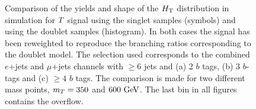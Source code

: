 \begin{figure}[htbp]
\begin{center}
\caption{
Comparison of the yields and shape of the $\HT$ distribution in simulation for $\T$ signal using the singlet samples (symbols) and
using the doublet samples (histogram). In both cases the signal has been reweighted to reproduce the branching ratios corresponding 
to the doublet model. The selection used corresponds to the combined $e$+jets and $\mu$+jets channels
with $\geq 6$ jets and (a) 2 $b$ tags,  (b) 3 $b$-tags and (c) $\geq 4$ $b$ tags. The comparison is made for two 
different mass points, $m_{\T}=350$ and $600\gev$.
The last bin in all figures contains the overflow.
\label{fig:HT_checks_SingletvsDoubletComp}}
\end{center}
\end{figure}


